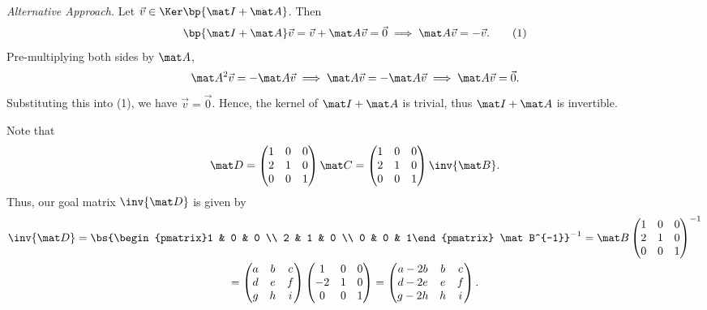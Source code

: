 \begin{solution}
\begin{ppart}
\begin{psubpart}
            \noindent\textit{Alternative Approach.} Let $\vec v \in \Ker \bp{\mat I + \mat A}$. Then \[\bp{\mat I + \mat A} \vec v = \vec v + \mat A \vec v = \vec 0 \implies \mat A \vec v = -\vec v. \tag{1}\] Pre-multiplying both sides by $\mat A$, \[\mat A^2 \vec v = -\mat A \vec v \implies \mat A \vec v = - \mat A \vec v \implies \mat A \vec v = \vec 0.\] Substituting this into (1), we have $\vec v = \vec 0$. Hence, the kernel of $\mat I + \mat A$ is trivial, thus $\mat I + \mat A$ is invertible.
        \end{psubpart}
    \end{ppart}
    \begin{ppart}
        Note that \[\mat D = \begin{pmatrix}1 & 0 & 0 \\ 2 & 1 & 0 \\ 0 & 0 & 1\end{pmatrix} \mat C = \begin{pmatrix}1 & 0 & 0 \\ 2 & 1 & 0 \\ 0 & 0 & 1\end{pmatrix} \inv{\mat B}.\] Thus, our goal matrix $\inv{\mat D}$ is given by
        \begin{gather*}
            \inv{\mat D} = \bs{\begin{pmatrix}1 & 0 & 0 \\ 2 & 1 & 0 \\ 0 & 0 & 1\end{pmatrix} \mat B^{-1}}^{-1} = \mat B \begin{pmatrix}1 & 0 & 0 \\ 2 & 1 & 0 \\ 0 & 0 & 1\end{pmatrix}^{-1} \\
            = \begin{pmatrix} a & b & c \\ d & e & f \\ g & h & i \end{pmatrix}\begin{pmatrix}1 & 0 & 0 \\ -2 & 1 & 0 \\ 0 & 0 & 1\end{pmatrix} = \begin{pmatrix}a-2b & b & c \\ d-2e & e & f \\ g-2h & h & i\end{pmatrix}.
        \end{gather*}
    \end{ppart}
\end{solution}